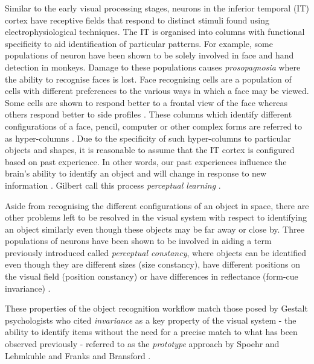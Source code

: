 Similar to the early visual processing stages, neurons in the inferior temporal (IT) cortex have receptive fields that respond to distinct stimuli found using electrophysiological techniques. 
The IT is organised into columns with functional specificity to aid identification of particular patterns\cite{tanaka2003columns, kandel2012principles}. 
For example, some populations of neuron have been shown to be solely involved in face and hand detection in monkeys\cite{tsao2006cortical, tsao2008comparing, kandel2012principles}. 
Damage to these populations causes \emph{prosopagnosia} where the ability to recognise faces\cite{kandel2012principles} is lost. Face recognising cells are a population of cells with different preferences to the various ways in which a face may be viewed.
Some cells are shown to respond better to a frontal view of the face whereas others respond better to side profiles \cite{Afraz06, kandel2012principles}. 
These columns which identify different configurations of a face, pencil, computer or other complex forms are referred to as hyper-columns \cite{tanaka2003columns, kandel2012principles}. 
Due to the specificity of such hyper-columns to particular objects and shapes, it is reasonable to assume that the IT cortex is configured based on past experience. 
In other words, our past experiences influence the brain's ability to identify an object and will change in response to new information \cite{kandel2012principles}. 
Gilbert \etal call this process \emph{perceptual learning} \cite{Gilbert2001681}.

Aside from recognising the different configurations of an object in space, there are other problems left to be resolved in the visual system with respect to identifying an object similarly even though these objects may be far away or close by. 
Three populations of neurons have been shown to be involved in aiding a term previously introduced called \emph{perceptual constancy}, where objects can be identified even though they are different sizes (size constancy), have different positions on the visual field (position constancy) or have differences in reflectance (form-cue invariance) \cite{schwartz1983shape}. 

These properties of the object recognition workflow match those posed by Gestalt psychologists who cited \emph{invariance} as a key property of the visual system - the ability to identify items without the need for a precise match to what has been observed previously - referred to as the \emph{prototype} approach by Spoehr and Lehmkuhle \cite{spoehr82} and Franks and Bransford \cite{franks71}.

